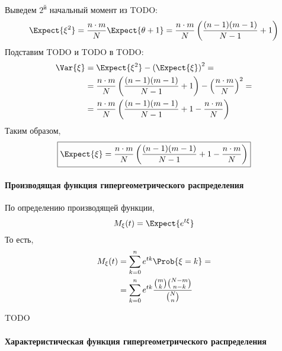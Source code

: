 Выведем \(2^\text{й}\) начальный момент из TODO: \[\Expect{\xi^2}
= \frac{n \cdot m}{N}\Expect{\theta+1}
= \frac{n \cdot m}{N}\left(\frac{(n-1)(m-1)}{N-1}+1\right)\] Подставим
TODO и TODO в TODO: \[\begin{aligned}
    \Var{\xi} &= \Expect{\xi^2} - \left(\Expect{\xi}\right)^2 =\\
              &= \frac{n \cdot m}{N}\left(\frac{(n-1)(m-1)}{N-1}+1\right)
                    - \left(\frac{n \cdot m}{N}\right)^2=\\
              &= \frac{n \cdot m}{N}\left(\frac{(n-1)(m-1)}{N-1} + 1
                   - \frac{n \cdot m}{N}\right)
\end{aligned}\] Таким образом, \[\boxed{
    \Expect{\xi} = \frac{n \cdot m}{N}\left(\frac{(n-1)(m-1)}{N-1} + 1 - \frac{n \cdot m}{N}\right)
}\]

\hypertarget{ux43fux440ux43eux438ux437ux432ux43eux434ux44fux449ux430ux44f-ux444ux443ux43dux43aux446ux438ux44f-ux433ux438ux43fux435ux440ux433ux435ux43eux43cux435ux442ux440ux438ux447ux435ux441ux43aux43eux433ux43e-ux440ux430ux441ux43fux440ux435ux434ux435ux43bux435ux43dux438ux44f}{%
\paragraph{Производящая функция гипергеометрического
распределения}\label{ux43fux440ux43eux438ux437ux432ux43eux434ux44fux449ux430ux44f-ux444ux443ux43dux43aux446ux438ux44f-ux433ux438ux43fux435ux440ux433ux435ux43eux43cux435ux442ux440ux438ux447ux435ux441ux43aux43eux433ux43e-ux440ux430ux441ux43fux440ux435ux434ux435ux43bux435ux43dux438ux44f}}

По определению производящей функции, \[M_\xi(t) = \Expect{e^{t\xi}}\] То
есть, \[\begin{aligned}
    M_\xi(t) &= \sum_{k=0}^{n} e^{tk}\Prob{\xi=k} =\\
             &= \sum_{k=0}^{n} e^{tk}\frac{\binom{m}{k}\binom{N-m}{n-k}}{\binom{N}{n}}
\end{aligned}\]

TODO

\hypertarget{ux445ux430ux440ux430ux43aux442ux435ux440ux438ux441ux442ux438ux447ux435ux441ux43aux430ux44f-ux444ux443ux43dux43aux446ux438ux44f-ux433ux438ux43fux435ux440ux433ux435ux43eux43cux435ux442ux440ux438ux447ux435ux441ux43aux43eux433ux43e-ux440ux430ux441ux43fux440ux435ux434ux435ux43bux435ux43dux438ux44f}{%
\paragraph{Характеристическая функция гипергеометрического
распределения}\label{ux445ux430ux440ux430ux43aux442ux435ux440ux438ux441ux442ux438ux447ux435ux441ux43aux430ux44f-ux444ux443ux43dux43aux446ux438ux44f-ux433ux438ux43fux435ux440ux433ux435ux43eux43cux435ux442ux440ux438ux447ux435ux441ux43aux43eux433ux43e-ux440ux430ux441ux43fux440ux435ux434ux435ux43bux435ux43dux438ux44f}}

